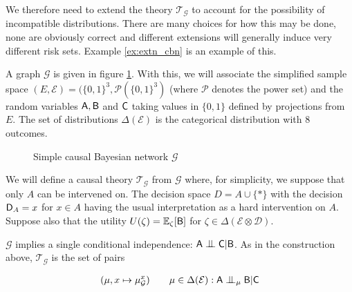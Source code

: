 We therefore need to extend the theory $\mathscr{T}_{\mathcal{G}}$ to account for the possibility of incompatible distributions. There are many choices for how this may be done, none are obviously correct and different extensions will generally induce very different risk sets. Example \ref{ex:extn_cbn} is an example of this.

\begin{example}\label{ex:extn_cbn}

A graph $\mathcal{G}$ is given in figure \ref{fig:simple_cbn}. With this, we will associate the simplified sample space $(E,\mathcal{E})=(\{0,1\}^3,\mathscr{P}(\{0,1\}^3)$ (where $\mathscr{P}$ denotes the power set) and the random variables $\mathsf{A},\mathsf{B}$ and $\mathsf{C}$ taking values in $\{0,1\}$ defined by projections from $E$. The set of distributions $\Delta(\mathcal{E})$ is the categorical distribution with 8 outcomes.

\begin{figure}
    \centering
    \caption{Simple causal Bayesian network $\mathcal{G}$}
    \label{fig:simple_cbn}
\end{figure}

We will define a causal theory $\mathscr{T}_{\mathcal{G}}$ from $\mathcal{G}$ where, for simplicity, we suppose that only $A$ can be intervened on. The decision space $D=A\cup\{*\}$ with the decision $\mathsf{D}_A=x$ for $x\in A$ having the usual interpretation as a hard intervention on $A$. Suppose also that the utility $U(\zeta)=\mathbb{E}_{\zeta}[\mathsf{B}]$ for $\zeta\in\Delta(\mathcal{E}\otimes\mathcal{D})$.

$\mathcal{G}$ implies a single conditional independence: $\RV{A}\CI \RV{C} | \RV{B}$. As in the construction above, $\mathscr{T}_{\mathcal{G}}$ is the set of pairs

\begin{align}
    (\mu,x\mapsto \mu_{\mathcal{G}}^x ) \qquad \mu\in\Delta(\mathcal{E}):\RV{A}\CI_{\mu}\RV{B}|\RV{C} \label{eq:ocbn}
\end{align}


\end{example}

